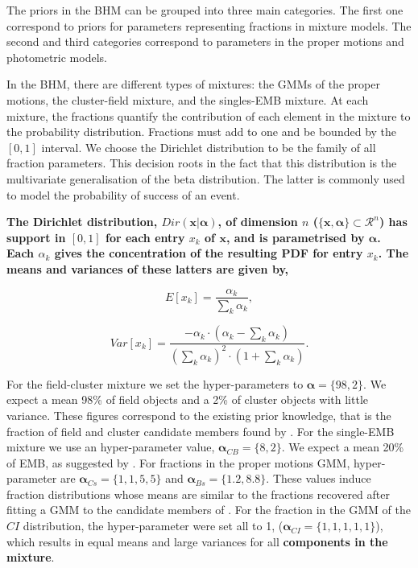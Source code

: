 The priors in the BHM can be grouped into three main categories. The first one correspond to priors for parameters representing fractions in mixture models. The second and third categories correspond to parameters in the proper motions and photometric models. 

In the BHM, there are different types of mixtures: the GMMs of the proper motions, the cluster-field mixture, and the singles-EMB mixture. At each mixture, the fractions quantify the contribution of each element in the mixture to the probability distribution. Fractions must add to one and be bounded by the $[0,1]$ interval.  We choose the Dirichlet distribution to be the family of all fraction parameters. This decision roots in the fact that this distribution is the multivariate generalisation of the beta distribution. The latter is commonly used to model the probability of success of an event.

\textbf{The Dirichlet distribution, $Dir(\mathbf{x}|\boldsymbol{\alpha})$, of dimension $n$ ($\{\mathbf{x},\boldsymbol{\alpha}\} \subset \mathcal{R}^n$) has support in $[0,1]$ for each entry $x_k$ of $\mathbf{x}$, and is parametrised by $\boldsymbol{\alpha}$. Each $\alpha_k$ gives the concentration of the resulting PDF for entry $x_k$. The means and variances of these latters are given by,}

\begin{equation}
E[x_k]=\frac{\alpha_k}{\sum_k \alpha_k},
\end{equation}

\begin{equation}
Var[x_k]=\frac{-\alpha_k\cdot (\alpha_k -\sum_k \alpha_k)}{(\sum_k \alpha_k)^2 \cdot (1+\sum_k \alpha_k)}.
\end{equation}

For the field-cluster mixture we set the hyper-parameters to $\boldsymbol{\alpha}=\{98,2\}$. We expect a mean 98\% of field objects and a 2\% of cluster objects with little variance. These figures correspond to the existing prior knowledge, that is the fraction of field and cluster candidate members found by \citet{Bouy2015}. 
For the single-EMB mixture we use an hyper-parameter value, $\boldsymbol{\alpha}_{CB}=\{8,2\}$. We expect a mean 20\% of EMB, as suggested by \citet{Bouy2015}. 
For fractions in the proper motions GMM, hyper-parameter are $\boldsymbol{\alpha}_{Cs}=\{1,1,5,5\}$ and $\boldsymbol{\alpha}_{Bs}=\{1.2,8.8\}$. These values induce fraction distributions whose means are similar to the fractions recovered after fitting a GMM to the  candidate members of \citet{Bouy2015}. 
For the fraction in the GMM of the $CI$ distribution, the hyper-parameter were set all to 1, ($\boldsymbol{\alpha}_{CI}=\{1,1,1,1,1\}$), which results in equal means and large variances for all \textbf{components in the mixture}. 

